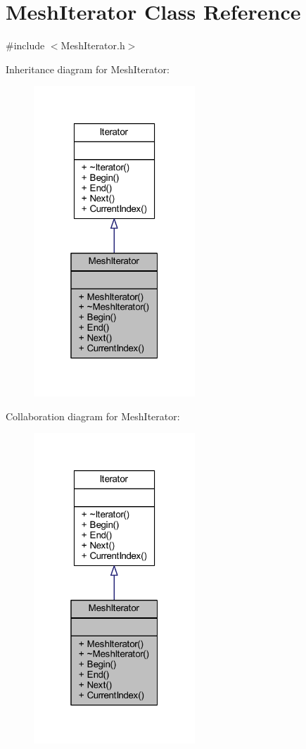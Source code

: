 \hypertarget{class_mesh_iterator}{}\section{Mesh\+Iterator Class Reference}
\label{class_mesh_iterator}


{\ttfamily \#include $<$Mesh\+Iterator.\+h$>$}



Inheritance diagram for Mesh\+Iterator\+:
\nopagebreak
\begin{figure}[H]
\begin{center}
\leavevmode
\includegraphics[width=172pt]{class_mesh_iterator__inherit__graph}
\end{center}
\end{figure}


Collaboration diagram for Mesh\+Iterator\+:
\nopagebreak
\begin{figure}[H]
\begin{center}
\leavevmode
\includegraphics[width=172pt]{class_mesh_iterator__coll__graph}
\end{center}
\end{figure}
